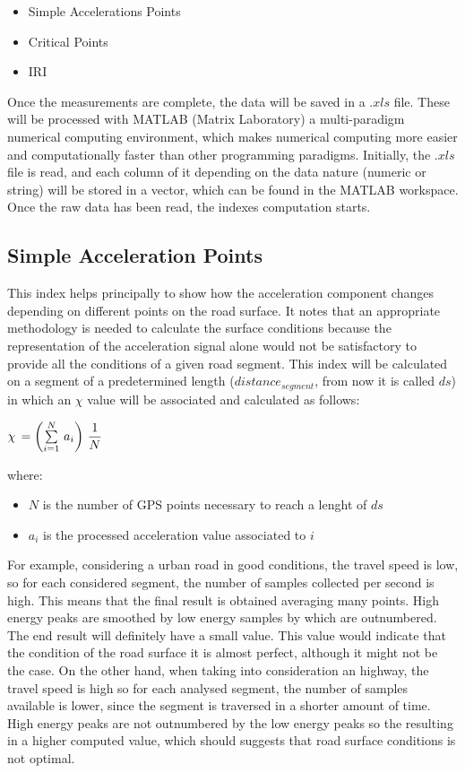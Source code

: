 \documentclass[tesi]{subfiles}
\begin{document}
 \begin{itemize}
 \item Simple Accelerations Points
 \item Critical Points
 \item IRI
 \end{itemize}
 
Once the measurements are complete, the data will be saved in a $.xls$ file.
These will be processed with MATLAB (Matrix Laboratory) a multi-paradigm numerical computing environment, which makes numerical computing more easier and computationally faster than other programming paradigms.
Initially, the $.xls$ file is read, and each column of it depending on the data nature (numeric or string) will be stored in a vector, which can be found in the MATLAB workspace.
Once the raw data has been read, the indexes computation starts.

\clearpage
\subsection{Simple Acceleration Points}\label{ssc:Simple Accelerations Points}
This index helps principally to show how the acceleration component changes depending on different points on the road surface.
It notes that an appropriate methodology is needed to calculate the surface conditions because the representation of the acceleration signal alone would not be satisfactory to provide all the conditions of a given road segment. This index will be calculated on a segment of a predetermined length ($distance_{segment}$, from now it is called $ds$) in which an $\chi$ value will be associated and calculated as follows:

\begin{center}
{\large  $\chi \thinspace = \left( \sum \limits_{i=1}^{N} \thinspace a_{i} \right) \thinspace \dfrac{1}{N}$}
\end{center}\label{eq:sap}
where:
\begin{itemize}
\item $N$ is the number of GPS points necessary to reach a lenght of $ds$
\item $a_{i}$ is the processed acceleration value associated to $i$
\end{itemize}

For example, considering a urban road in good conditions, the travel speed is low, so for each considered segment, the number of samples collected per second is high.
This means that the final result is obtained averaging many points.
High energy peaks are smoothed by low energy samples by which are outnumbered.
The end result will definitely have a small value.
This value would indicate that the condition of the road surface it is almost perfect, although it might not be the case.
On the other hand, when taking into consideration an highway, the travel speed is  high so for each analysed segment, the number of samples available is lower, since the segment is traversed in a shorter amount of time.
High energy peaks are not outnumbered by the low energy peaks so the resulting in a higher computed value, which should suggests that road surface conditions is not optimal.
\end{document}
